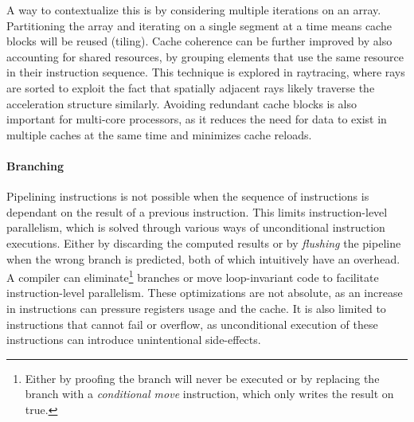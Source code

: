 \documentclass{article}
\begin{document}
A way to contextualize this is by considering multiple iterations on an array.
Partitioning the array and iterating on a single segment at a time means cache blocks will be reused (tiling).
Cache coherence can be further improved by also accounting for shared resources, by grouping elements that use the same resource in their instruction sequence. 
This technique is explored in raytracing\cite{raytracing-reorder-ray}, where rays are sorted to exploit the fact that spatially adjacent rays likely traverse the acceleration structure similarly.
Avoiding redundant cache blocks is also important for multi-core processors, as it reduces the need for data to exist in multiple caches at the same time and minimizes cache reloads.

\paragraph{Branching}

Pipelining instructions is not possible when the sequence of instructions is dependant on the result of a previous instruction.
This limits instruction-level parallelism, which is solved through various ways of unconditional instruction executions\cite{instruction-level-parallelism}.
Either by discarding the computed results or by {\it flushing} the pipeline when the wrong branch is predicted, both of which intuitively have an overhead.
A compiler can eliminate\footnote{Either by proofing the branch will never be executed or by replacing the branch with a {\it conditional move} instruction, which only writes the result on true.} branches or move loop-invariant code to facilitate instruction-level parallelism\cite{assembly-optimizations}. 
These optimizations are not absolute, as an increase in instructions can pressure registers usage and the cache.  
It is also limited to instructions that cannot fail or overflow, as unconditional execution of these instructions can introduce unintentional side-effects.  
\end{document}
